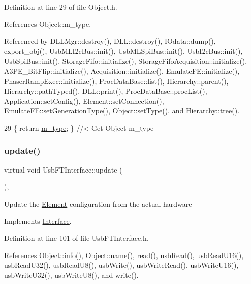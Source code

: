 Definition at line 29 of file Object.\+h.



References Object\+::m\+\_\+type.



Referenced by D\+L\+L\+Mgr\+::destroy(), D\+L\+L\+::destroy(), I\+Odata\+::dump(), export\+\_\+obj(), Usb\+M\+L\+I2c\+Bus\+::init(), Usb\+M\+L\+Spi\+Bus\+::init(), Usb\+I2c\+Bus\+::init(), Usb\+Spi\+Bus\+::init(), Storage\+Fifo\+::initialize(), Storage\+Fifo\+Acquisition\+::initialize(), A3\+P\+E\+\_\+\+Bit\+Flip\+::initialize(), Acquisition\+::initialize(), Emulate\+F\+E\+::initialize(), Phaser\+Ramp\+Exec\+::initialize(), Proc\+Data\+Base\+::list(), Hierarchy\+::parent(), Hierarchy\+::path\+Typed(), D\+L\+L\+::print(), Proc\+Data\+Base\+::proc\+List(), Application\+::set\+Config(), Element\+::set\+Connection(), Emulate\+F\+E\+::set\+Generation\+Type(), Object\+::set\+Type(), and Hierarchy\+::tree().


\begin{DoxyCode}
29 \{ \textcolor{keywordflow}{return} \hyperlink{classObject_a457a600fe8c00eb1034374f75110a78c}{m\_type};       \} \textcolor{comment}{//< Get Object m\_type}
\end{DoxyCode}
\mbox{\label{classUsbFTInterface_a6adc58a50696c9b3268e84c291901ce7}} 
\subsubsection{\texorpdfstring{update()}{update()}}
{\footnotesize\ttfamily virtual void Usb\+F\+T\+Interface\+::update (\begin{DoxyParamCaption}{ }\end{DoxyParamCaption})\hspace{0.3cm}{\ttfamily [inline]}, {\ttfamily [virtual]}}

Update the \hyperlink{classElement}{Element} configuration from the actual hardware 

Implements \hyperlink{classInterface_a30e71ffbe36091df9f7c0838dd4b60d2}{Interface}.



Definition at line 101 of file Usb\+F\+T\+Interface.\+h.



References Object\+::info(), Object\+::name(), read(), usb\+Read(), usb\+Read\+U16(), usb\+Read\+U32(), usb\+Read\+U8(), usb\+Write(), usb\+Write\+Read(), usb\+Write\+U16(), usb\+Write\+U32(), usb\+Write\+U8(), and write().



